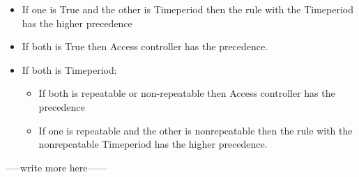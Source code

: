 \begin{itemize}
	\item If one is True and the other is Timeperiod then the rule with the Timeperiod has the higher precedence
	\item If both is True then Access controller has the precedence.
	\item If both is Timeperiod:
		\begin{itemize}
			\item If both is repeatable or non-repeatable then Access controller has the precedence
			\item If one is repeatable and the other is nonrepeatable then the rule with the nonrepeatable Timeperiod has the higher precedence.
		\end{itemize}
\end{itemize}

-----write more here------
